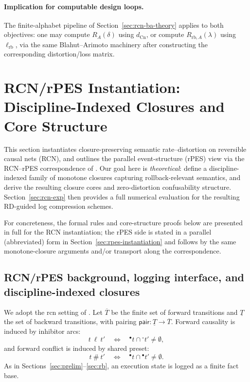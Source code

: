 \documentclass[twoside]{article}
\newcommand{\Cn}{\mathrm{Cn}}
\newcommand{\1}{\mathbf{1}}
\begin{document}
\paragraph{Implication for computable design loops.}
The finite-alphabet pipeline of Section~\ref{sec:rcn-ba-theory} applies to both objectives:
one may compute \(R_A(\delta)\) using \(d_{\Cn}\), or compute \(R_{\mathrm{rb},A}(\lambda)\) using \(\ell_{\mathrm{rb}}\),
via the same Blahut--Arimoto machinery after constructing the corresponding distortion/loss matrix.

\section{RCN/rPES Instantiation: Discipline-Indexed Closures and Core Structure}
\label{sec:rcn-theory}

This section instantiates closure-preserving semantic rate--distortion on reversible causal nets (RCN),
and outlines the parallel event-structure (rPES) view via the RCN--rPES correspondence of \cite{melgratti2024reversible}.
Our goal here is \emph{theoretical}: define a discipline-indexed family of monotone closures capturing rollback-relevant semantics,
and derive the resulting closure cores and zero-distortion confusability structure.
Section~\ref{sec:rcn-exp} then provides a full numerical evaluation for the
resulting RD-guided log compression schemes.

For concreteness, the formal rules and core-structure proofs below are presented in full for the RCN instantiation;
the rPES side is stated in a parallel (abbreviated) form in Section~\ref{sec:rpes-instantiation} and follows by the same monotone-closure
arguments and/or transport along the correspondence.

\subsection{RCN/rPES background, logging interface, and discipline-indexed closures}
\label{sec:rcn-background-interface}

We adopt the rcn setting of \cite[\S7]{melgratti2024reversible}.
Let \(\overline{T}\) be the finite set of forward transitions and \(\underline{T}\) the set of backward transitions,
with pairing \(\mathsf{pair}:\underline{T}\to\overline{T}\).
Forward causality is induced by inhibitor arcs:
\[
t\ \ell\ t' \quad\Longleftrightarrow\quad {^\bullet t}\cap {^\circ t'}\neq\emptyset,
\]
and forward conflict is induced by shared preset:
\[
t\ \#\ t' \quad\Longleftrightarrow\quad {^\bullet t}\cap {^\bullet t'}\neq\emptyset.
\]
As in Sections~\ref{sec:prelim}--\ref{sec:rb}, an execution state is logged as a finite fact base.
\end{document}
